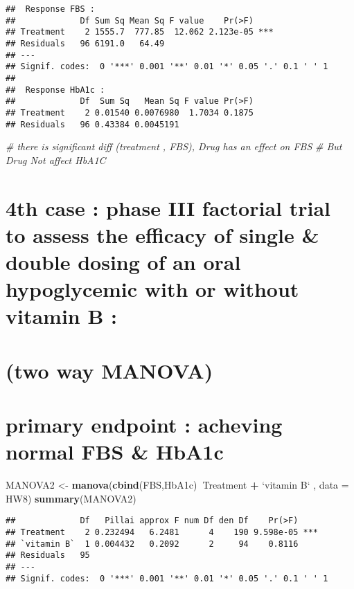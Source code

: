 \documentclass[]{article}
\newenvironment{Shaded}{\begin{snugshade}}{\end{snugshade}}
\newcommand{\KeywordTok}[1]{\textcolor[rgb]{0.13,0.29,0.53}{\textbf{#1}}}
\newcommand{\DataTypeTok}[1]{\textcolor[rgb]{0.13,0.29,0.53}{#1}}
\newcommand{\StringTok}[1]{\textcolor[rgb]{0.31,0.60,0.02}{#1}}
\newcommand{\CommentTok}[1]{\textcolor[rgb]{0.56,0.35,0.01}{\textit{#1}}}
\newcommand{\OperatorTok}[1]{\textcolor[rgb]{0.81,0.36,0.00}{\textbf{#1}}}
\newcommand{\NormalTok}[1]{#1}
\begin{document}
\begin{verbatim}
##  Response FBS :
##             Df Sum Sq Mean Sq F value    Pr(>F)    
## Treatment    2 1555.7  777.85  12.062 2.123e-05 ***
## Residuals   96 6191.0   64.49                      
## ---
## Signif. codes:  0 '***' 0.001 '**' 0.01 '*' 0.05 '.' 0.1 ' ' 1
## 
##  Response HbA1c :
##             Df  Sum Sq   Mean Sq F value Pr(>F)
## Treatment    2 0.01540 0.0076980  1.7034 0.1875
## Residuals   96 0.43384 0.0045191
\end{verbatim}

\begin{Shaded}
\begin{Highlighting}[]
\CommentTok{# there is significant diff (treatment , FBS), Drug has an effect on FBS  }
\CommentTok{# But Drug Not affect HbA1C }
\end{Highlighting}
\end{Shaded}

\section{4th case : phase III factorial trial to assess the efficacy of
single \& double dosing of an oral hypoglycemic with or without vitamin
B
:}\label{th-case-phase-iii-factorial-trial-to-assess-the-efficacy-of-single-double-dosing-of-an-oral-hypoglycemic-with-or-without-vitamin-b}

\section{(two way MANOVA)}\label{two-way-manova}

\section{primary endpoint : acheving normal FBS \&
HbA1c}\label{primary-endpoint-acheving-normal-fbs-hba1c-1}

\begin{Shaded}
\begin{Highlighting}[]
\NormalTok{MANOVA2 <-}\StringTok{ }\KeywordTok{manova}\NormalTok{(}\KeywordTok{cbind}\NormalTok{(FBS,HbA1c)}\OperatorTok{~}\NormalTok{Treatment }\OperatorTok{+}\StringTok{ `}\DataTypeTok{vitamin B}\StringTok{`}\NormalTok{ , }\DataTypeTok{data =}\NormalTok{ HW8)}
\KeywordTok{summary}\NormalTok{(MANOVA2)}
\end{Highlighting}
\end{Shaded}

\begin{verbatim}
##             Df   Pillai approx F num Df den Df    Pr(>F)    
## Treatment    2 0.232494   6.2481      4    190 9.598e-05 ***
## `vitamin B`  1 0.004432   0.2092      2     94    0.8116    
## Residuals   95                                              
## ---
## Signif. codes:  0 '***' 0.001 '**' 0.01 '*' 0.05 '.' 0.1 ' ' 1
\end{verbatim}
\end{document}
